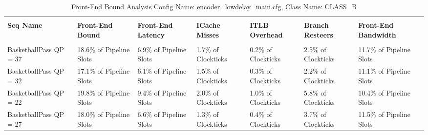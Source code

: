 \documentclass{article}%
\begin{document}
\begin{longtabu}{| X[l] | X[l] | X[l] | X[l] | X[l] | X[l] | X[l] |}%
\caption{%
Front{-}End Bound Analysis\newline%
 Config Name: encoder\_lowdelay\_main.cfg,\newline%
 Class Name: CLASS\_B\newline%
%
}%
\hline%
&&&&&&\\%
\textbf{Seq Name}&\textbf{Front{-}End Bound}&\textbf{Front{-}End Latency}&\textbf{ICache Misses}&\textbf{ITLB Overhead}&\textbf{Branch Resteers}&\textbf{Front{-}End Bandwidth}\\%
&&&&&&\\%
\hline%
\endhead%
BasketballPass\newline%
 QP = 37&18.6\% of Pipeline Slots&6.9\% of Pipeline Slots&1.7\% of Clockticks&0.2\% of Clockticks&2.5\% of Clockticks&11.7\% of Pipeline Slots\\%
\hline%
BasketballPass\newline%
 QP = 32&17.1\% of Pipeline Slots&6.1\% of Pipeline Slots&1.5\% of Clockticks&0.3\% of Clockticks&2.2\% of Clockticks&11.1\% of Pipeline Slots\\%
\hline%
BasketballPass\newline%
 QP = 22&19.8\% of Pipeline Slots&9.4\% of Pipeline Slots&2.0\% of Clockticks&1.0\% of Clockticks&5.8\% of Clockticks&10.4\% of Pipeline Slots\\%
\hline%
BasketballPass\newline%
 QP = 27&18.0\% of Pipeline Slots&6.6\% of Pipeline Slots&1.3\% of Clockticks&0.4\% of Clockticks&3.7\% of Clockticks&11.5\% of Pipeline Slots\\%
\hline%
\end{longtabu}%
\newpage%
\end{document}
